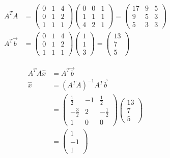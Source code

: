 \begin{align}
    A^T A &= \begin{pmatrix}
        0 & 1 & 4 \\ 0 & 1 & 2 \\ 1 & 1 & 1
    \end{pmatrix} \begin{pmatrix}
        0 & 0 & 1 \\ 1 & 1 & 1 \\ 4 & 2 & 1
    \end{pmatrix} = \begin{pmatrix}
        17 & 9 & 5 \\
        9 & 5 & 3 \\
        5 & 3 & 3
    \end{pmatrix} \\
    A^T \Vec{b} &= \begin{pmatrix}
        0 & 1 & 4 \\ 0 & 1 & 2 \\ 1 & 1 & 1
    \end{pmatrix} \begin{pmatrix}
        1 \\ 1 \\ 3
    \end{pmatrix} = \begin{pmatrix}
        13 \\ 7 \\ 5
    \end{pmatrix}
\end{align}

\begin{align}
    A^T A \hat{x} &= A^T \Vec{b} \\
    \hat{x} &= (A^T A)^{-1} A^T \Vec{b} \\
    &= \begin{pmatrix}
        \frac{1}{2} & -1 & \frac{1}{2} \\
        -\frac{3}{2} & 2 & -\frac{1}{2} \\
        1 & 0 & 0
    \end{pmatrix} \begin{pmatrix}
        13 \\ 7 \\ 5
    \end{pmatrix} \\
    &= \begin{pmatrix}
        1 \\ -1 \\ 1
    \end{pmatrix}
\end{align}

